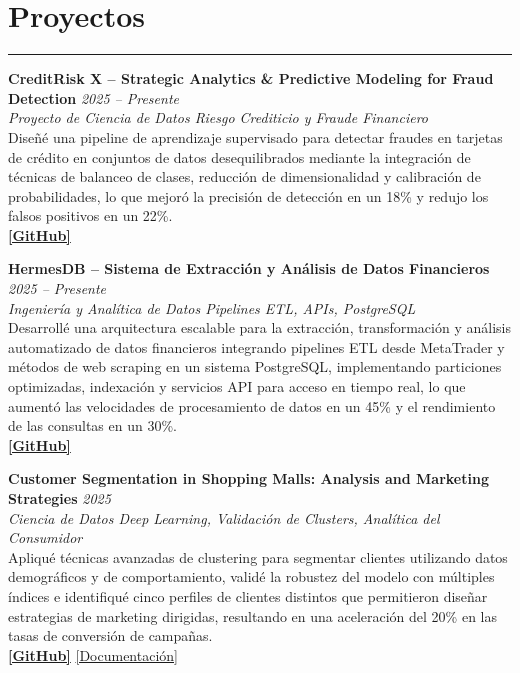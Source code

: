 \documentclass[9pt,a4paper]{article}
\begin{document}
\section*{Proyectos}
\vspace{-\baselineskip}
\noindent\rule{\linewidth}{0.5pt}

\textbf{CreditRisk X – Strategic Analytics \& Predictive Modeling for Fraud Detection} \hfill \textit{2025 – Presente} \\
\textit{Proyecto de Ciencia de Datos \textbar{} Riesgo Crediticio y Fraude Financiero} \\
Diseñé una pipeline de aprendizaje supervisado para detectar fraudes en tarjetas de crédito en conjuntos de datos desequilibrados mediante la integración de técnicas de balanceo de clases, reducción de dimensionalidad y calibración de probabilidades, lo que mejoró la precisión de detección en un 18\% y redujo los falsos positivos en un 22\%. \\
\textbf{\href{https://github.com/Ares-Infenus/Credit-Risk-Assessment}{[GitHub]}}

\textbf{HermesDB – Sistema de Extracción y Análisis de Datos Financieros} \hfill \textit{2025 – Presente} \\
\textit{Ingeniería y Analítica de Datos \textbar{} Pipelines ETL, APIs, PostgreSQL} \\
Desarrollé una arquitectura escalable para la extracción, transformación y análisis automatizado de datos financieros integrando pipelines ETL desde MetaTrader y métodos de web scraping en un sistema PostgreSQL, implementando particiones optimizadas, indexación y servicios API para acceso en tiempo real, lo que aumentó las velocidades de procesamiento de datos en un 45\% y el rendimiento de las consultas en un 30\%. \\
\textbf{\href{https://github.com/Ares-Infenus/HERMESDB}{[GitHub]}}

\textbf{Customer Segmentation in Shopping Malls: Analysis and Marketing Strategies} \hfill \textit{2025} \\
\textit{Ciencia de Datos \textbar{} Deep Learning, Validación de Clusters, Analítica del Consumidor} \\
Apliqué técnicas avanzadas de clustering para segmentar clientes utilizando datos demográficos y de comportamiento, validé la robustez del modelo con múltiples índices e identifiqué cinco perfiles de clientes distintos que permitieron diseñar estrategias de marketing dirigidas, resultando en una aceleración del 20\% en las tasas de conversión de campañas. \\
\textbf{\href{https://github.com/Ares-Infenus/Customer-Segmentation-in-Shopping-Malls}{[GitHub]}} \textbar{} \href{https://www.linkedin.com/in/sebastiandpinzon/details/projects/1241739216/multiple-media-viewer/?profileId=ACoAAE1Rr-wBOmNQPb8b_Cv0upjAksei7ukFViM&treasuryMediaId=1742855945746}{[Documentación]}
\end{document}
